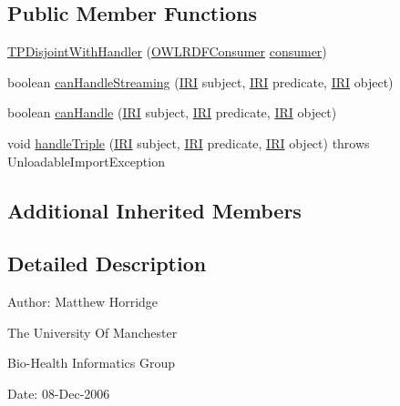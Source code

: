 \subsection*{Public Member Functions}
\begin{DoxyCompactItemize}
\item 
\hyperlink{classorg_1_1coode_1_1owlapi_1_1rdfxml_1_1parser_1_1_t_p_disjoint_with_handler_a24224e30410caca6cd2f984fa294daa5}{T\-P\-Disjoint\-With\-Handler} (\hyperlink{classorg_1_1coode_1_1owlapi_1_1rdfxml_1_1parser_1_1_o_w_l_r_d_f_consumer}{O\-W\-L\-R\-D\-F\-Consumer} \hyperlink{classorg_1_1coode_1_1owlapi_1_1rdfxml_1_1parser_1_1_abstract_triple_handler_a4ccf4d898ff01eb1cadfa04b23d54e9c}{consumer})
\item 
boolean \hyperlink{classorg_1_1coode_1_1owlapi_1_1rdfxml_1_1parser_1_1_t_p_disjoint_with_handler_a845e37bdfdf8a30f7a8f260357da5ba8}{can\-Handle\-Streaming} (\hyperlink{classorg_1_1semanticweb_1_1owlapi_1_1model_1_1_i_r_i}{I\-R\-I} subject, \hyperlink{classorg_1_1semanticweb_1_1owlapi_1_1model_1_1_i_r_i}{I\-R\-I} predicate, \hyperlink{classorg_1_1semanticweb_1_1owlapi_1_1model_1_1_i_r_i}{I\-R\-I} object)
\item 
boolean \hyperlink{classorg_1_1coode_1_1owlapi_1_1rdfxml_1_1parser_1_1_t_p_disjoint_with_handler_a70727c2d0b6e3ce64ace2f2a4a1505a5}{can\-Handle} (\hyperlink{classorg_1_1semanticweb_1_1owlapi_1_1model_1_1_i_r_i}{I\-R\-I} subject, \hyperlink{classorg_1_1semanticweb_1_1owlapi_1_1model_1_1_i_r_i}{I\-R\-I} predicate, \hyperlink{classorg_1_1semanticweb_1_1owlapi_1_1model_1_1_i_r_i}{I\-R\-I} object)
\item 
void \hyperlink{classorg_1_1coode_1_1owlapi_1_1rdfxml_1_1parser_1_1_t_p_disjoint_with_handler_a62040ddb577fa1b7f933423900190395}{handle\-Triple} (\hyperlink{classorg_1_1semanticweb_1_1owlapi_1_1model_1_1_i_r_i}{I\-R\-I} subject, \hyperlink{classorg_1_1semanticweb_1_1owlapi_1_1model_1_1_i_r_i}{I\-R\-I} predicate, \hyperlink{classorg_1_1semanticweb_1_1owlapi_1_1model_1_1_i_r_i}{I\-R\-I} object)  throws Unloadable\-Import\-Exception 
\end{DoxyCompactItemize}
\subsection*{Additional Inherited Members}


\subsection{Detailed Description}
Author\-: Matthew Horridge\par
 The University Of Manchester\par
 Bio-\/\-Health Informatics Group\par
 Date\-: 08-\/\-Dec-\/2006\par
\par
 

